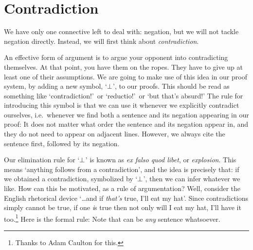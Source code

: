 

\section{Contradiction}
We have only one connective left to deal with: negation, but we will not tackle negation directly. Instead, we will first think about \emph{contradiction}. 

An effective form of argument is to argue your opponent into contradicting themselves. At that point, you have them on the ropes. They have to give up at least one of their assumptions. We are going to make use of this idea in our proof system, by adding a new symbol, `$\bot$', to our proofs. This should be read as something like `contradiction!'\ or `reductio!'\ or `but that's absurd!'  The rule for introducing this symbol is that we can use it whenever we explicitly contradict ourselves, i.e.\ whenever we find both a sentence and its negation appearing in our proof:
It does not matter what order the sentence and its negation appear in, and they do not need to appear on adjacent lines. However, we always cite the sentence first, followed by its negation. 

Our elimination rule for `$\bot$' is known as \emph{ex falso quod libet}, or \emph{explosion}. This means `anything follows from a contradiction', and the idea is precisely that: if we obtained a contradiction, symbolized by `$\bot$', then we can infer whatever we like. How can this be motivated, as a rule of argumentation? Well, consider the English rhetorical device `\ldots and if \emph{that's} true, I'll eat my hat'. Since contradictions simply cannot be true, if one \emph{i}s true then not only will I eat my hat, I'll have it too.\footnote{Thanks to Adam Caulton for this.} Here is the formal rule:
Note that \metaX can be \emph{any} sentence whatsoever. 

